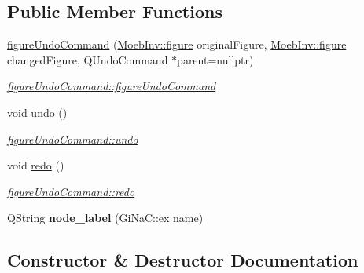 \subsection*{Public Member Functions}
\begin{DoxyCompactItemize}
\item 
\mbox{\hyperlink{classfigure_undo_command_af29d6f2ed7bcff9fdae44a83707d0d76}{figure\+Undo\+Command}} (\mbox{\hyperlink{class_moeb_inv_1_1figure}{Moeb\+Inv\+::figure}} original\+Figure, \mbox{\hyperlink{class_moeb_inv_1_1figure}{Moeb\+Inv\+::figure}} changed\+Figure, Q\+Undo\+Command $\ast$parent=nullptr)
\begin{DoxyCompactList}\small\item\em \mbox{\hyperlink{classfigure_undo_command_af29d6f2ed7bcff9fdae44a83707d0d76}{figure\+Undo\+Command\+::figure\+Undo\+Command}} \end{DoxyCompactList}\item 
void \mbox{\hyperlink{classfigure_undo_command_a9e733f81f847b07673f141bf13c5aace}{undo}} ()
\begin{DoxyCompactList}\small\item\em \mbox{\hyperlink{classfigure_undo_command_a9e733f81f847b07673f141bf13c5aace}{figure\+Undo\+Command\+::undo}} \end{DoxyCompactList}\item 
void \mbox{\hyperlink{classfigure_undo_command_aec81e1bda86663871b7ff1cb6e8d5fda}{redo}} ()
\begin{DoxyCompactList}\small\item\em \mbox{\hyperlink{classfigure_undo_command_aec81e1bda86663871b7ff1cb6e8d5fda}{figure\+Undo\+Command\+::redo}} \end{DoxyCompactList}\item 
\mbox{\label{classfigure_undo_command_a571773dcb5236289e16f0d444e9785e5}} 
Q\+String {\bfseries node\+\_\+label} (Gi\+Na\+C\+::ex name)
\end{DoxyCompactItemize}


\subsection{Constructor \& Destructor Documentation}
\mbox{\label{classfigure_undo_command_af29d6f2ed7bcff9fdae44a83707d0d76}} 
